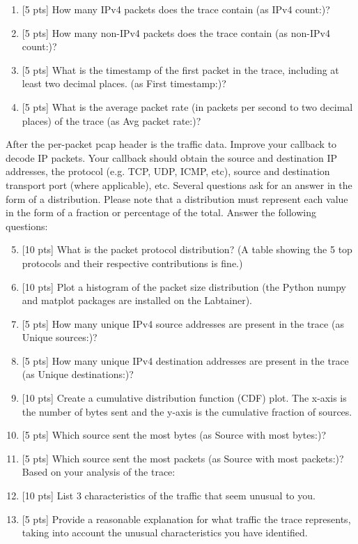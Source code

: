 \begin{enumerate}
\item {[5 pts]} How many IPv4 packets does the trace contain (as IPv4 count:)?
\item {[5 pts]} How many non-IPv4 packets does the trace contain (as non-IPv4 count:)?
\item {[5 pts]} What is the timestamp of the first packet in the trace, including at least two decimal places.
(as First timestamp:)?
\item {[5 pts]} What is the average packet rate (in packets per second to two decimal places) of the trace (as Avg packet rate:)?
\end{enumerate}
After the per-packet pcap header is the traffic data. Improve your callback to decode IP packets. Your callback should obtain the source and destination IP addresses, the protocol (e.g. TCP, UDP, ICMP, etc), source and destination transport port (where applicable), etc.
Several questions ask for an answer in the form of a distribution. Please note that a distribution must represent each value in the form of a fraction or percentage of the total. Answer the following questions:
\begin{enumerate}
\setcounter{enumi}{4}
\item {[10 pts]} What is the packet protocol distribution? (A table showing the 5 top protocols and their respective contributions is fine.)
\item {[10 pts]} Plot a histogram of the packet size distribution (the Python numpy and matplot packages are installed on the Labtainer).
\item {[5 pts]} How many unique IPv4 source addresses are present in the trace (as Unique sources:)?
\item {[5 pts]} How many unique IPv4 destination addresses are present in the trace (as Unique destinations:)?
\item {[10 pts]} Create a cumulative distribution function (CDF) plot. The x-axis is the number of bytes sent and the y-axis is the cumulative fraction of sources.
\item {[5 pts]} Which source sent the most bytes (as Source with most bytes:)?
\item {[5 pts]} Which source sent the most packets (as Source with most packets:)?
Based on your analysis of the trace:
\item {[10 pts]} List 3 characteristics of the traffic that seem unusual to you.
\item {[5 pts]} Provide a reasonable explanation for what traffic the trace represents, taking into account the unusual characteristics you have identified.
\end{enumerate}

